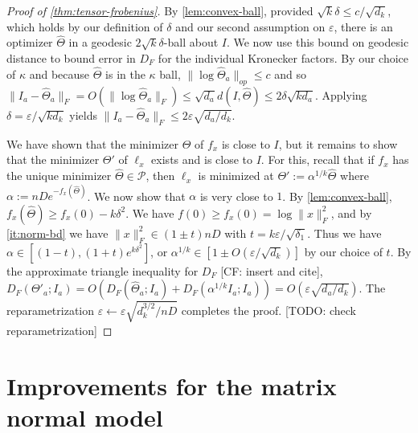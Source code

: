 \documentclass[aos]{imsart}
\theoremstyle{definition}
\numberwithin{equation}{section}
\newcommand{\eps}{\varepsilon}
\newcommand{\SPD}{\mathcal{P}}
\newcommand{\samp}{x}
\newcommand{\CF}[1]{{\color{purple}[CF: #1]}}
\newcommand{\TODO}[1]{{\color{blue}[TODO: #1]}}
\begin{document}
\begin{proof}[Proof of \cref{thm:tensor-frobenius}]

By \cref{lem:convex-ball}, provided $\sqrt{k} \delta \leq c/\sqrt{d_k}$, which holds by our definition of $\delta$ and our second assumption on $\eps$, there is an optimizer $\widehat{\Theta}$ in a geodesic $2 \sqrt{k} \delta$-ball about $I$. We now use this bound on geodesic distance to bound error in $D_F$ for the individual Kronecker factors. By our choice of $\kappa$ and because $\widehat{\Theta}$ is in the $\kappa$ ball, $\|\log \widehat{\Theta}_a\|_{op} \leq c$ and so $\|I_a - \widehat{\Theta}_a\|_F = O( \| \log \widehat{\Theta}_a\|_F) \leq \sqrt{d_a} d(I, \widehat{\Theta}) \leq 2\delta \sqrt{ k d_a}.$ Applying $\delta = \eps /\sqrt{k d_k}$ yields $\| I_a - \widehat{\Theta}_a\|_F \leq 2\eps \sqrt{ d_a/d_k}$.

We have shown that the minimizer $\widehat{\Theta}$ of $f_\samp$ is close to $I$, but it remains to show that the minimizer $\Theta'$ of $\ell_\samp$ exists and is close to $I$. For this, recall that if $f_\samp$ has the unique minimizer $\widehat{\Theta} \in \SPD$, then $\ell_\samp$ is minimized at $\Theta':= \alpha^{1/k}  \widehat{\Theta}$ where $\alpha:= n D e^{ - f_\samp(\widehat{\Theta})}$. We now show that $\alpha$ is very close to $1$. By \cref{lem:convex-ball}, $f_\samp(\widehat{\Theta}) \geq f_\samp(0) - k\delta^2$. We have $f(0) \geq f_\samp(0) = \log\| \samp\|^2_F$, and by \cref{it:norm-bd} we have $\| \samp\|_F^2 \in (1 \pm t) nD$ with $t = k \eps/\sqrt{\delta_1}$. Thus we have $\alpha \in [(1-t),  (1+t) e^{k \delta^2}]$, or $\alpha^{1/k} \in [1 \pm  O(\eps/\sqrt{d_k})]$ by our choice of $t$. By the approximate triangle inequality for $D_F$ \CF{insert and cite}, $D_F( \Theta'_a; I_a) = O(D_F(\widehat{\Theta}_a; I_a) + D_F(\alpha^{1/k} I_a; I_a)) = O(\eps \sqrt{d_a/d_k})$. The reparametrization $\eps \leftarrow \eps \sqrt{d_k^{3/2}/ n D}$ completes the proof. \TODO{check reparametrization}
\end{proof}

\section{Improvements for the matrix normal model}\label{sec:matrix-normal-ii}
\end{document}
